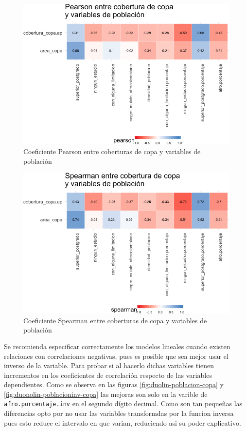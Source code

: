 \documentclass[12pt,]{book}
\begin{document}
\begin{figure}
\includegraphics[width=1\linewidth]{tesis-unigis_files/figure-latex/tile-copa-poblacion-pearson-1} \caption{Coeficiente Pearson entre coberturas de copa y variables de población}\label{fig:tile-copa-poblacion-pearson}
\end{figure}

\begin{figure}
\includegraphics[width=1\linewidth]{tesis-unigis_files/figure-latex/tile-copa-poblacion-spearman-1} \caption{Coeficiente Spearman entre coberturas de copa y variables de población}\label{fig:tile-copa-poblacion-spearman}
\end{figure}

Se recomienda especificar correctamente los modelos lineales cuando
existen relaciones con correlaciones negativas, pues es posible que sea
mejor usar el inverso de la variable. Para probar si al hacerlo dichas
variables tienen incrementos en los coeficientes de correlación respecto
de las variables dependientes. Como se observa en las figuras
\ref{fig:duolin-poblacion-copa} y \ref{fig:duonolin-poblacioninv-copa}
las mejoras son solo en la varible de \texttt{afro.porcentaje.inv} en el
segundo dígito decimal. Como son tan pequeñas las diferencias opto por
no usar las variables transformdas por la funcion inversa pues esto
reduce el intervalo en que varian, reduciendo asi su poder explicativo.
\end{document}
